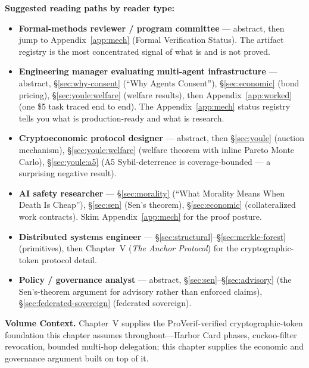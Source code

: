 \documentclass[11pt,a4paper]{article}
\theoremstyle{definition}
\theoremstyle{remark}
\begin{document}
\vspace{0.6cm}
\noindent\textbf{Suggested reading paths by reader type:}
\begin{itemize}[nosep,leftmargin=*,topsep=2pt]
\item \textbf{Formal-methods reviewer / program committee} --- abstract, then jump to Appendix~\ref{app:mech} (Formal Verification Status). The artifact registry is the most concentrated signal of what is and is not proved.
\item \textbf{Engineering manager evaluating multi-agent infrastructure} --- abstract, \S\ref{sec:why-consent} (``Why Agents Consent''), \S\ref{sec:economic} (bond pricing), \S\ref{sec:youle:welfare} (welfare results), then Appendix~\ref{app:worked} (one \$5 task traced end to end). The Appendix~\ref{app:mech} status registry tells you what is production-ready and what is research.
\item \textbf{Cryptoeconomic protocol designer} --- abstract, then \S\ref{sec:youle} (auction mechanism), \S\ref{sec:youle:welfare} (welfare theorem with inline Pareto Monte Carlo), \S\ref{sec:youle:a5} (A5 Sybil-deterrence is coverage-bounded --- a surprising negative result).
\item \textbf{AI safety researcher} --- \S\ref{sec:morality} (``What Morality Means When Death Is Cheap''), \S\ref{sec:sen} (Sen's theorem), \S\ref{sec:economic} (collateralized work contracts). Skim Appendix~\ref{app:mech} for the proof posture.
\item \textbf{Distributed systems engineer} --- \S\ref{sec:structural}--\S\ref{sec:merkle-forest} (primitives), then Chapter~V (\emph{The Anchor Protocol}) for the cryptographic-token protocol detail.
\item \textbf{Policy / governance analyst} --- abstract, \S\ref{sec:sen}--\S\ref{sec:advisory} (the Sen's-theorem argument for advisory rather than enforced claims), \S\ref{sec:federated-sovereign} (federated sovereign).
\end{itemize}

\vspace{0.5cm}
\noindent\textbf{Volume Context.} Chapter~V supplies the ProVerif-verified cryptographic-token foundation this chapter assumes throughout---Harbor Card phases, cuckoo-filter revocation, bounded multi-hop delegation; this chapter supplies the economic and governance argument built on top of it.

\newpage
\tableofcontents
\newpage

\end{document}
